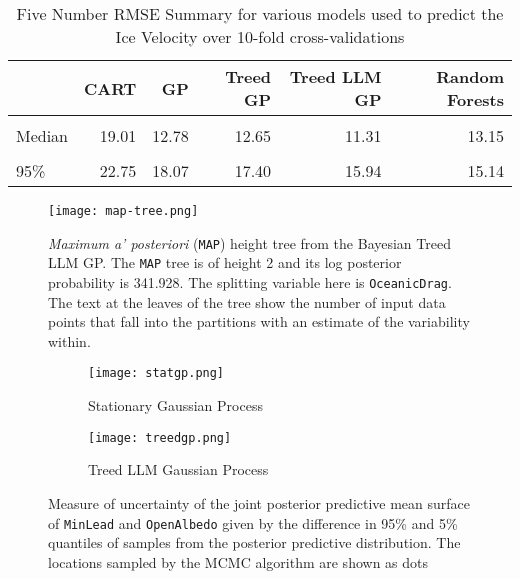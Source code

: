\documentclass{article}\usepackage[]{graphicx}\usepackage[]{color}
\newenvironment{knitrout}{}{} %
\begin{document}
\begin{knitrout}
\color{fgcolor}\begin{table}[H]

\caption{\label{tab:unnamed-chunk-1} Five Number RMSE Summary for various models used to predict the Ice Velocity over 10-fold cross-validations}
\centering
\begin{tabular}[t]{lrrrrr}
\toprule
  & CART & GP & Treed GP & Treed LLM GP & Random Forests\\
\midrule
\cellcolor{gray!6}{Mean} & \cellcolor{gray!6}{18.43} & \cellcolor{gray!6}{13.12} & \cellcolor{gray!6}{13.08} & \cellcolor{gray!6}{12.72} & \cellcolor{gray!6}{12.78}\\
Median & 19.01 & 12.78 & 12.65 & 11.31 & 13.15\\
\cellcolor{gray!6}{5\%} & \cellcolor{gray!6}{14.93} & \cellcolor{gray!6}{8.83} & \cellcolor{gray!6}{8.63} & \cellcolor{gray!6}{7.26} & \cellcolor{gray!6}{9.94}\\
95\% & 22.75 & 18.07 & 17.40 & 15.94 & 15.14\\
\bottomrule
\end{tabular}
\end{table}
\end{knitrout}


\begin{figure}[H]
  \centering
  \texttt{[image: map-tree.png]} 
  \caption{\textit{Maximum a' posteriori} (\texttt{MAP}) height tree from the Bayesian Treed LLM GP. The \texttt{MAP} tree is of height 2 and its log posterior probability is 341.928. The splitting variable here is \texttt{OceanicDrag}. The text at the leaves of the tree show the number of input data points that fall into the partitions with an estimate of the variability within.}
  \label{fig:T2}
\end{figure}


\begin{figure}[H]
\centering
\begin{subfigure}{0.5\textwidth}
  \centering
  \texttt{[image: statgp.png]}
  \caption{Stationary Gaussian Process}
  \label{fig:sub1}
\end{subfigure}%
\begin{subfigure}{0.5\textwidth}
  \centering
  \texttt{[image: treedgp.png]}
  \caption{Treed LLM Gaussian Process}
  \label{fig:sub2}
\end{subfigure}
\caption{Measure of uncertainty of the joint posterior predictive mean surface of \texttt{MinLead} and \texttt{OpenAlbedo} given by the difference in 95\% and 5\% quantiles of samples from the posterior predictive distribution. The locations sampled by the MCMC algorithm are shown as dots}
\label{fig:test}
\end{figure}
\end{document}
